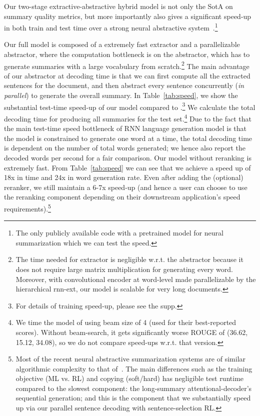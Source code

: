 \documentclass[11pt,a4paper]{article}
\def\tabref#1{Table~\ref{#1}}
\begin{document}
Our two-stage extractive-abstractive hybrid model is not only the SotA on summary quality metrics, but more importantly also gives a significant speed-up in both train and test time over a strong neural abstractive system~\citep{get_to_the_point}.\footnote{The only publicly available code with a pretrained model for neural summarization which we can test the speed.}

Our full model is composed of a extremely fast extractor and a parallelizable abstractor, where the computation bottleneck is on the abstractor, which has to generate summaries with a large vocabulary from scratch.\footnote{The time needed for extractor is negligible w.r.t. the abstractor because it does not require large matrix multiplication for generating every word.
Moreover, with convolutional encoder at word-level made parallelizable by the hierarchical rnn-ext, our model is scalable for very long documents.}
The main advantage of our abstractor at decoding time is that we can first compute all the extracted sentences for the document, and then abstract every sentence concurrently (\emph{in parallel}) to generate the overall summary.
In \tabref{tab:speed}, we show the substantial test-time speed-up of our model compared to \citet{get_to_the_point}.\footnote{For details of training speed-up, please see the supp.}
We calculate the total decoding time for producing all summaries for the test set.\footnote{We time the model of \citet{get_to_the_point} using beam size of 4 (used for their best-reported scores).
Without beam-search, it gets significantly worse ROUGE of (36.62, 15.12, 34.08), so we do not compare speed-ups w.r.t. that version.}
Due to the fact that the main test-time speed bottleneck of RNN language generation model is that the model is constrained to generate one word at a time,
the total decoding time is dependent on the number of total words generated; we hence also report the decoded words per second for a fair comparison.
Our model without reranking is extremely fast. 
From \tabref{tab:speed} we can see that we achieve a speed up of 18x in time and 24x in word generation rate. 
Even after adding the (optional) reranker, we still maintain a 6-7x speed-up (and hence a user can choose to use the reranking component depending on their downstream application's speed requirements).\footnote{Most of the recent neural abstractive summarization systems are of similar algorithmic complexity to that of~\citet{get_to_the_point}.
The main differences such as the training objective (ML vs. RL) and copying (soft/hard) has negligible test runtime compared to the slowest component: the long-summary attentional-decoder's sequential generation;
and this is the component that we substantially speed up via our parallel sentence decoding with sentence-selection RL.}
\end{document}
